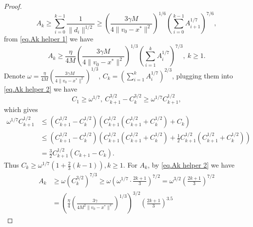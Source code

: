 \documentclass{mcom-l}
\numberwithin{equation}{section}
\begin{document}
\begin{proof}
    \begin{equation*}
        A_k\geq\sum_{i=0}^{k-1}\frac{1}{\|d_i\|^{1/2}} \geq \left (\frac{3\gamma M}{4\|v_0-x^*\|^2}\right)^{1/6} \left(\sum_{i=0}^{k-1} A_{i+1}^{1 / 7}\right)^{7 / 6},
    \end{equation*}
    from \eqref{eq.Ak helper 1} we have
    \begin{equation}
        \label{eq.Ak helper 2}
        A_k \geq \frac{\eta}{4M}\left (\frac{3\gamma M}{4\|v_0-x^*\|^2}\right)^{1/3} \left(\sum_{i=1}^{k} A_{i}^{1 / 7}\right)^{7 / 3}, \ k\geq 1.
    \end{equation}
    Denote $\omega = \frac{\eta}{4M}\left (\frac{3\gamma M}{4\|v_0-x^*\|^2}\right)^{1/3}$, $C_k =\left(\sum_{i=1}^k A_i^{1 / 7}\right)^{2 / 3}$, plugging them into \eqref{eq.Ak helper 2} we have
    \begin{equation*}
        C_1\geq\omega^{1/7},\ C_{k+1}^{3 / 2}-C_k^{3 / 2} \geq \omega^{1 / 7} C_{k+1}^{1 / 2},
    \end{equation*}
    which gives
    \begin{equation*}
        \begin{aligned}
            \omega^{1 / 7} C_{k+1}^{1 / 2} & \leq\left(C_{k+1}^{1 / 2}-C_k^{1 / 2}\right)\left(C_{k+1}^{1 / 2}\left(C_{k+1}^{1 / 2}+C_k^{1 / 2}\right)+C_k\right)                                                                 \\
                                           & \leq\left(C_{k+1}^{1 / 2}-C_k^{1 / 2}\right)\left(C_{k+1}^{1 / 2}\left(C_{k+1}^{1 / 2}+C_k^{1 / 2}\right)+\frac{1}{2} C_{k+1}^{1 / 2}\left(C_{k+1}^{1 / 2}+C_k^{1 / 2}\right)\right) \\
                                           & =\frac{3}{2} C_{k+1}^{1 / 2}\left(C_{k+1}-C_k\right).
        \end{aligned}
    \end{equation*}
    Thus $C_k \geq \omega^{1 / 7}\left(1+\frac{2}{3}(k-1)\right), k \geq 1$. For $A_k$, by \eqref{eq.Ak helper 2} we have
    \begin{equation*}
        \begin{aligned}
            A_k & \geq \omega\left(C_k^{3 / 2}\right)^{7 / 3} \geq \omega\left(\omega^{1 / 7} \cdot \frac{2 k+1}{3}\right)^{7 / 2}=\omega^{3 / 2}\left(\frac{2 k+1}{3}\right)^{7 / 2} \\
                & =\left(\frac{\eta}{4}\left (\frac{3\gamma}{4M^2\|v_0-x^*\|^2}\right)^{1/3}\right)^{3 / 2}\left(\frac{2 k+1}{3}\right)^{3.5}
        \end{aligned}
    \end{equation*}
\end{proof}
\end{document}
